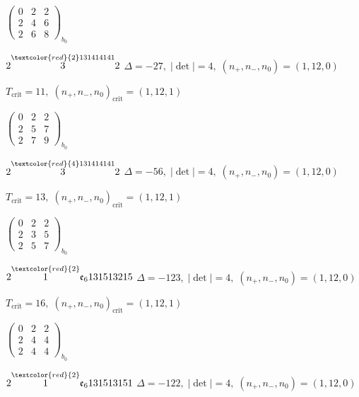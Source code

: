 \documentclass[10pt]{article}
\begin{document}
\hspace{2em}$\left(\begin{smallmatrix}0 & 2 & 2 \\ 2 & 4 & 6 \\ 2 & 6 & 8\end{smallmatrix}\right)_{\!b_0}$

$2\overset{\textcolor{red}{2}131414141}{3}2$ \quad $\Delta=-27,\; |\det|=4,\; (n_+,n_-,n_0)=(1,12,0)$

\hspace{1em}$T_{\text{crit}}=11,\; (n_+,n_-,n_0)_{\text{crit}}=(1,12,1)$

\hspace{2em}$\left(\begin{smallmatrix}0 & 2 & 2 \\ 2 & 5 & 7 \\ 2 & 7 & 9\end{smallmatrix}\right)_{\!b_0}$

$2\overset{\textcolor{red}{4}131414141}{3}2$ \quad $\Delta=-56,\; |\det|=4,\; (n_+,n_-,n_0)=(1,12,0)$

\hspace{1em}$T_{\text{crit}}=13,\; (n_+,n_-,n_0)_{\text{crit}}=(1,12,1)$

\hspace{2em}$\left(\begin{smallmatrix}0 & 2 & 2 \\ 2 & 3 & 5 \\ 2 & 5 & 7\end{smallmatrix}\right)_{\!b_0}$

\smallskip

$2\overset{\textcolor{red}{2}}{1}\mathfrak{e}_6131513215$ \quad $\Delta=-123,\; |\det|=4,\; (n_+,n_-,n_0)=(1,12,0)$

\hspace{1em}$T_{\text{crit}}=16,\; (n_+,n_-,n_0)_{\text{crit}}=(1,12,1)$

\hspace{2em}$\left(\begin{smallmatrix}0 & 2 & 2 \\ 2 & 4 & 4 \\ 2 & 4 & 4\end{smallmatrix}\right)_{\!b_0}$

\smallskip

$2\overset{\textcolor{red}{2}}{1}\mathfrak{e}_6131513151$ \quad $\Delta=-122,\; |\det|=4,\; (n_+,n_-,n_0)=(1,12,0)$
\end{document}
